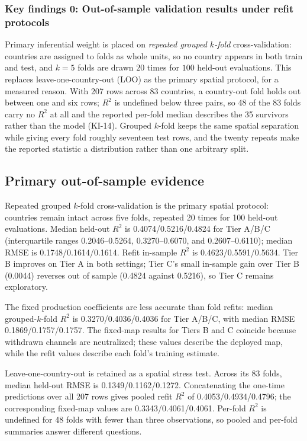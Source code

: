 \documentclass[11pt]{article}
\begin{document}
\subsubsection*{Key findings 0: Out-of-sample validation results under refit protocols}

Primary inferential weight is placed on \emph{repeated grouped $k$-fold} cross-validation: countries are assigned to folds as whole units, so no country appears in both train and test, and $k=5$ folds are drawn $20$ times for $100$ held-out evaluations. This replaces leave-one-country-out (LOO) as the primary spatial protocol, for a measured reason. With 207 rows across 83 countries, a country-out fold holds out between one and six rows; $R^2$ is undefined below three pairs, so 48 of the 83 folds carry no $R^2$ at all and the reported per-fold median describes the 35 survivors rather than the model (KI-14). Grouped $k$-fold keeps the same spatial separation while giving every fold roughly seventeen test rows, and the twenty repeats make the reported statistic a distribution rather than one arbitrary split.

\subsection*{Primary out-of-sample evidence}
Repeated grouped $k$-fold cross-validation is the primary spatial protocol: countries remain intact across five folds, repeated 20 times for 100 held-out evaluations. Median held-out $R^2$ is \num{0.4074}/\num{0.5216}/\num{0.4824} for Tier A/B/C (interquartile ranges \num{0.2046}--\num{0.5264}, \num{0.3270}--\num{0.6070}, and \num{0.2607}--\num{0.6110}); median RMSE is \num{0.1748}/\num{0.1614}/\num{0.1614}. Refit in-sample $R^2$ is \num{0.4623}/\num{0.5591}/\num{0.5634}. Tier B improves on Tier A in both settings; Tier C's small in-sample gain over Tier B (\num{0.0044}) reverses out of sample (\num{0.4824} against \num{0.5216}), so Tier C remains exploratory.

The fixed production coefficients are less accurate than fold refits: median grouped-$k$-fold $R^2$ is \num{0.3270}/\num{0.4036}/\num{0.4036} for Tier A/B/C, with median RMSE \num{0.1869}/\num{0.1757}/\num{0.1757}. The fixed-map results for Tiers B and C coincide because withdrawn channels are neutralized; these values describe the deployed map, while the refit values describe each fold's training estimate.

Leave-one-country-out is retained as a spatial stress test. Across its 83 folds, median held-out RMSE is \num{0.1349}/\num{0.1162}/\num{0.1272}. Concatenating the one-time predictions over all 207 rows gives pooled refit $R^2$ of \num{0.4053}/\num{0.4934}/\num{0.4796}; the corresponding fixed-map values are \num{0.3343}/\num{0.4061}/\num{0.4061}. Per-fold $R^2$ is undefined for 48 folds with fewer than three observations, so pooled and per-fold summaries answer different questions.
\end{document}
